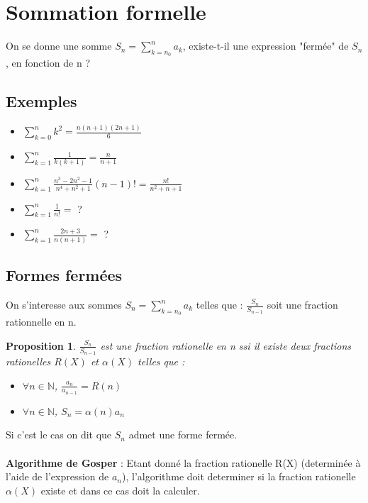 \documentclass[17 pt,french]{scrartcl}
\newtheorem{prop}{Proposition}
\begin{document}
	\section*{Sommation formelle}
	
	On se donne une somme $S_n = \sum_{k=n_0}^n {a_k} $, existe-t-il une expression "fermée" de $S_n$, en fonction de n ?
	
    \subsection*{Exemples}
    	\begin{itemize}
    		\item $\sum_{k=0}^n k^2 = \frac{n(n+1)(2n+1)}{6}$\\
    		
		\item $\sum_{k=1}^n \frac{1}{k(k+1)} = \frac{n}{n+1}$\\
			
		\item $ \sum_{k=1}^n {\frac{n^3-2n^2-1}{n^4+n^2+1}(n-1)!} = \frac{n!}{n^2+n+1}$\\
		
		\item $ \sum_{k=1}^n {\frac{1}{n!}} = $ ? \\
		\item $ \sum_{k=1}^n {\frac{2n+3}{n(n+1)}} = $ ? \\
	\end{itemize}
	
	\subsection*{Formes fermées}
	On s'interesse aux sommes  $S_n = \sum_{k=n_0}^n {a_k} $ telles que : $\frac{S_n}{S_{n-1}}$ soit une fraction rationnelle en n.
	
	\begin{prop}
	 $\frac{S_n}{S_{n-1}}$ est une fraction rationelle en n ssi il existe deux fractions rationelles $R(X)$ et $\alpha(X)$ telles que : 
	 \begin{itemize}
	 \item $\forall n \in \mathbb{N}$, $\frac{a_n}{a_{n-1}} = R(n)$
	 \item $\forall n \in \mathbb{N}$, $S_n = \alpha(n)a_n$
	 \end{itemize}
	\end{prop}

	Si c'est le cas on dit que $S_n$ admet une forme fermée.\\ \\
	\textbf{Algorithme de Gosper} :
		Etant donné la fraction rationelle R(X) (determinée à l'aide de l'expression de $a_n$), l'algorithme doit determiner si la fraction rationelle $\alpha(X)$ existe et dans ce cas doit la calculer.
		\newpage
\end{document}
